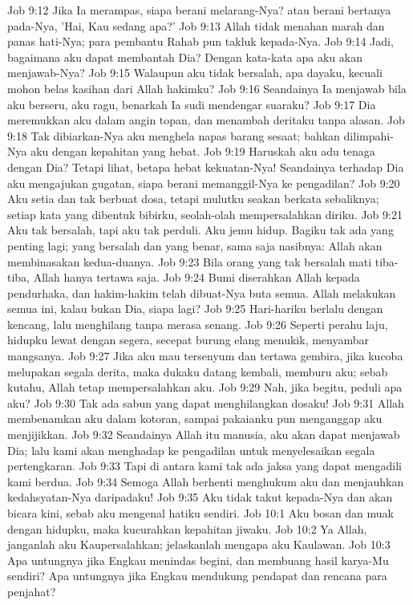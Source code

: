 Job 9:12  Jika Ia merampas, siapa berani melarang-Nya? atau berani bertanya pada-Nya, 'Hai, Kau sedang apa?'
Job 9:13  Allah tidak menahan marah dan panas hati-Nya; para pembantu Rahab pun takluk kepada-Nya.
Job 9:14  Jadi, bagaimana aku dapat membantah Dia? Dengan kata-kata apa aku akan menjawab-Nya?
Job 9:15  Walaupun aku tidak bersalah, apa dayaku, kecuali mohon belas kasihan dari Allah hakimku?
Job 9:16  Seandainya Ia menjawab bila aku berseru, aku ragu, benarkah Ia sudi mendengar suaraku?
Job 9:17  Dia meremukkan aku dalam angin topan, dan menambah deritaku tanpa alasan.
Job 9:18  Tak dibiarkan-Nya aku menghela napas barang sesaat; bahkan dilimpahi-Nya aku dengan kepahitan yang hebat.
Job 9:19  Haruskah aku adu tenaga dengan Dia? Tetapi lihat, betapa hebat kekuatan-Nya! Seandainya terhadap Dia aku mengajukan gugatan, siapa berani memanggil-Nya ke pengadilan?
Job 9:20  Aku setia dan tak berbuat dosa, tetapi mulutku seakan berkata sebaliknya; setiap kata yang dibentuk bibirku, seolah-olah mempersalahkan diriku.
Job 9:21  Aku tak bersalah, tapi aku tak perduli. Aku jemu hidup. Bagiku tak ada yang penting lagi; yang bersalah dan yang benar, sama saja nasibnya: Allah akan membinasakan kedua-duanya.
Job 9:23  Bila orang yang tak bersalah mati tiba-tiba, Allah hanya tertawa saja.
Job 9:24  Bumi diserahkan Allah kepada pendurhaka, dan hakim-hakim telah dibuat-Nya buta semua. Allah melakukan semua ini, kalau bukan Dia, siapa lagi?
Job 9:25  Hari-hariku berlalu dengan kencang, lalu menghilang tanpa merasa senang.
Job 9:26  Seperti perahu laju, hidupku lewat dengan segera, secepat burung elang menukik, menyambar mangsanya.
Job 9:27  Jika aku mau tersenyum dan tertawa gembira, jika kucoba melupakan segala derita, maka dukaku datang kembali, memburu aku; sebab kutahu, Allah tetap mempersalahkan aku.
Job 9:29  Nah, jika begitu, peduli apa aku?
Job 9:30  Tak ada sabun yang dapat menghilangkan dosaku!
Job 9:31  Allah membenamkan aku dalam kotoran, sampai pakaianku pun menganggap aku menjijikkan.
Job 9:32  Seandainya Allah itu manusia, aku akan dapat menjawab Dia; lalu kami akan menghadap ke pengadilan untuk menyelesaikan segala pertengkaran.
Job 9:33  Tapi di antara kami tak ada jaksa yang dapat mengadili kami berdua.
Job 9:34  Semoga Allah berhenti menghukum aku dan menjauhkan kedahsyatan-Nya daripadaku!
Job 9:35  Aku tidak takut kepada-Nya dan akan bicara kini, sebab aku mengenal hatiku sendiri.
Job 10:1  Aku bosan dan muak dengan hidupku, maka kucurahkan kepahitan jiwaku.
Job 10:2  Ya Allah, janganlah aku Kaupersalahkan; jelaskanlah mengapa aku Kaulawan.
Job 10:3  Apa untungnya jika Engkau menindas begini, dan membuang hasil karya-Mu sendiri? Apa untungnya jika Engkau mendukung pendapat dan rencana para penjahat?
